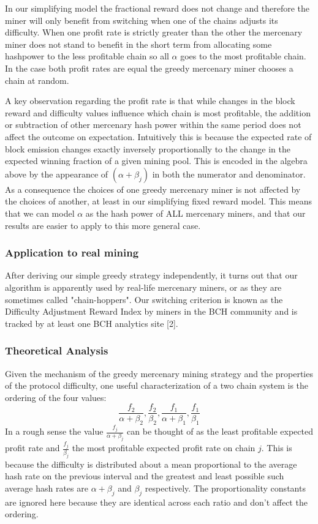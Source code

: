 \documentclass[10pt, preprint]{aastex}
\begin{document}
In our simplifying model the fractional reward does not change and therefore the miner will only benefit from switching when one of the chains adjusts its difficulty.  When one profit rate is strictly greater than the other the mercenary miner does not stand to benefit in the short term from allocating some hashpower to the less profitable chain so all $\alpha$ goes to the most profitable chain.  In the case both profit rates are equal the greedy mercenary miner chooses a chain at random. 

A key observation regarding the profit rate is that while changes in the block reward and difficulty values influence which chain is most profitable, the addition or subtraction of other mercenary hash power within the same period does not affect the outcome on expectation.  Intuitively this is because the expected rate of block emission changes exactly inversely proportionally to the change in the expected winning fraction of a given mining pool.  This is encoded in the algebra above by the appearance of $(\alpha + \beta_j)$ in both the numerator and denominator.  As a consequence the choices of one greedy mercenary miner is not affected by the choices of another, at least in our simplifying fixed reward model.  This means that we can model $\alpha$ as the hash power of ALL mercenary miners, and that our results are easier to apply to this more general case.

\subsubsection{Application to real mining}
After deriving our simple greedy strategy independently, it turns out that our algorithm is apparently used by real-life mercenary miners, or as they are sometimes called "chain-hoppers".  Our switching criterion is known as the Difficulty Adjustment Reward Index by miners in the BCH community and is tracked by at least one BCH analytics site [2].

\subsubsection{Theoretical Analysis}
Given the mechanism of the greedy mercenary mining strategy and the properties of the protocol difficulty, one useful characterization of a two chain system is the ordering of the four values: 
$$
\frac{f_2}{\alpha + \beta_2}, \frac{f_2}{\beta_2}, \frac{f_1}{\alpha + \beta_1}, \frac{f_1}{\beta_1}
$$
In a rough sense the value $\frac{f_j}{\alpha + \beta_j}$ can be thought of as the least profitable expected profit rate and $\frac{f_j}{\beta_j}$ the most profitable expected profit rate on chain $j$.  This is because the difficulty is distributed about a mean proportional to the average hash rate on the previous interval and the greatest and least possible such average hash rates are $\alpha + \beta_j$ and $\beta_j$ respectively.  The proportionality constants are ignored here because they are identical across each ratio and don't affect the ordering.  
\end{document}
